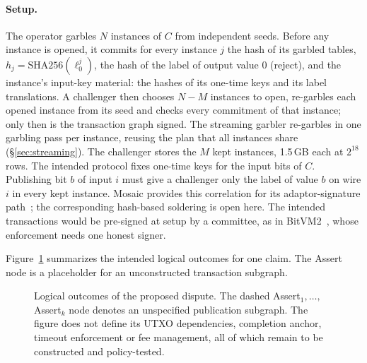 \documentclass[11pt]{article}
\begin{document}
\paragraph{Setup.} The operator garbles $N$ instances of $C$ from independent
seeds. Before any instance is opened, it commits for every instance $j$ the
hash of its garbled tables, $h_j=\mathrm{SHA256}(\ell^j_0)$, the hash of the
label of output value 0 (reject), and the instance's input-key material: the
hashes of its one-time keys and its label translations. A challenger then
chooses $N-M$ instances to open, re-garbles each opened instance from its seed
and checks every commitment of that instance; only then is the transaction
graph signed. The streaming garbler re-garbles in one garbling pass per instance, reusing the plan that all
instances share (\S\ref{sec:streaming}). The challenger stores the $M$ kept
instances, 1.5\,GB each at $2^{18}$ rows. The intended protocol fixes one-time
keys for the input bits of $C$. Publishing bit $b$ of input $i$ must give a challenger only the label of
value $b$ on wire $i$ in every kept instance. Mosaic provides this correlation
for its adaptor-signature path~\cite{mosaic26}; the corresponding hash-based
soldering is open here. The intended transactions would be pre-signed at setup
by a committee, as in BitVM2~\cite{laa25bitvm2}, whose enforcement needs one
honest signer.

Figure~\ref{fig:graph} summarizes the intended logical outcomes for one claim.
The Assert node is a placeholder for an unconstructed transaction subgraph.

\begin{figure}[t!]\centering
{}
\caption{Logical outcomes of the proposed dispute. The dashed
Assert$_1,\ldots,$Assert$_k$ node denotes an unspecified publication subgraph.
The figure does not define its UTXO dependencies, completion anchor, timeout
enforcement or fee management, all of which remain to be constructed and
policy-tested.}
\label{fig:graph}
\end{figure}
\end{document}
